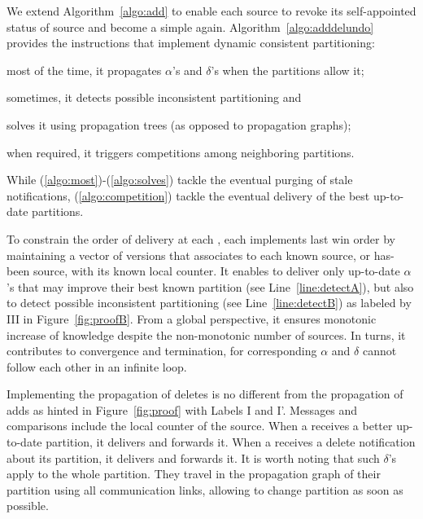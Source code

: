 We extend Algorithm~\ref{algo:add} to enable each source to revoke its
self-appointed status of source and become a simple \process again.
Algorithm~\ref{algo:adddelundo} provides the instructions that
implement dynamic consistent partitioning:
\begin{inparaenum}[(i)]
\item \label{algo:most} most of the time, it propagates $\alpha$'s and
  $\delta$'s when the partitions allow it;
\item \label{algo:sometimes} sometimes, it detects possible
  inconsistent partitioning and
\item \label{algo:solves}solves it using propagation trees (as opposed
  to propagation graphs);
\item \label{algo:competition} when required, it triggers competitions
  among neighboring partitions.
\end{inparaenum}
While (\ref{algo:most})-(\ref{algo:solves}) tackle the eventual purging of
stale notifications, (\ref{algo:competition}) tackle the eventual
delivery of the best up-to-date partitions.

To constrain the order of delivery at each \process, each \process
implements last win order by maintaining a vector of versions that
associates to each known source, or has-been source, with its known
local counter. It enables \processes to deliver only up-to-date
$\alpha$'s that may improve their best known partition (see
Line~\ref{line:detectA}), but also to detect possible inconsistent
partitioning (see Line~\ref{line:detectB}) as labeled by III in
Figure~\ref{fig:proofB}. From a global perspective, it ensures
monotonic increase of knowledge despite the non-monotonic number of
sources. In turns, it contributes to convergence and termination, for
corresponding $\alpha$ and $\delta$ cannot follow each other in an
infinite loop.

Implementing the propagation of deletes is no different from the
propagation of adds as hinted in Figure~\ref{fig:proof} with Labels I
and I'. Messages and comparisons include the local counter of the
source. When a \process receives a better up-to-date partition, it
delivers and forwards it. When a \process receives a delete
notification about its partition, it delivers and forwards it. It is
worth noting that such $\delta$'s apply to the whole partition. They
travel in the propagation graph of their partition using all
communication links, allowing \processes to change partition as soon as
possible.

